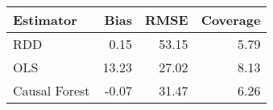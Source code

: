 \begin{table}[ht]
\centering
\begin{tabular}{lrrr}
  \hline
Estimator & Bias & RMSE & Coverage \\ 
  \hline
RDD & 0.15 & 53.15 & 5.79 \\ 
  OLS & 13.23 & 27.02 & 8.13 \\ 
  Causal Forest & -0.07 & 31.47 & 6.26 \\ 
   \hline
\end{tabular}
\end{table}
